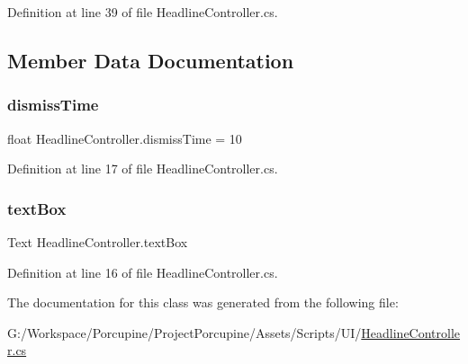 Definition at line 39 of file Headline\+Controller.\+cs.



\subsection{Member Data Documentation}
\mbox{\label{class_headline_controller_ac3dd2838ff920e0b2c269b79a6bfac9c}} 
\subsubsection{\texorpdfstring{dismiss\+Time}{dismissTime}}
{\footnotesize\ttfamily float Headline\+Controller.\+dismiss\+Time = 10}



Definition at line 17 of file Headline\+Controller.\+cs.

\mbox{\label{class_headline_controller_a6bb8f23f70364f69e66645602a011fa7}} 
\subsubsection{\texorpdfstring{text\+Box}{textBox}}
{\footnotesize\ttfamily Text Headline\+Controller.\+text\+Box}



Definition at line 16 of file Headline\+Controller.\+cs.



The documentation for this class was generated from the following file\+:\begin{DoxyCompactItemize}
\item 
G\+:/\+Workspace/\+Porcupine/\+Project\+Porcupine/\+Assets/\+Scripts/\+U\+I/\hyperlink{_headline_controller_8cs}{Headline\+Controller.\+cs}\end{DoxyCompactItemize}
